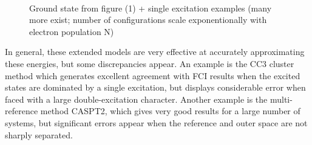 \documentclass[10pt]{article}
\begin{document}
\begin{figure}
	\centering
	\label{figure}
	\caption{Ground state from figure (1) + single excitation examples (many more exist; number of configurations scale exponentionally with electron population N)}
	\\
\end{figure}
In general, these extended models are very effective at accurately approximating these energies, but some discrepancies appear. An example is the CC3 cluster method which generates excellent agreement with FCI results when the excited states are dominated by a single excitation, but displays considerable error when faced with a large double-excitation character. Another example is the multi-reference method CASPT2, which gives very good results for a large number of systems, but significant errors appear when the reference and outer space are not sharply separated.
\end{document}

